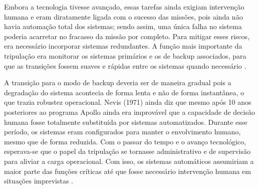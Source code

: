 Embora a tecnologia tivesse avançado, essas tarefas ainda exigiam intervenção humana e eram diratamente ligada com o sucesso das missões, pois ainda não havia automação total dos sistemas; sendo assim, uma única falha no sistema poderia acarretar no fracasso da missão por completo.
Para mitigar esses riscos, era necessário incorporar sistemas redundantes.
A função mais importante da tripulação era monitorar os sistemas primários e os de backup associados, para que as transições fossem suaves e rápidas entre os sistemas quando necessário \cite{nevins1971}.

A transição para o modo de backup deveria ser de maneira gradual pois a degradação do sistema acontecia de forma lenta e não de forma instantânea, o que trazia robustez operacional.
Nevis (1971) ainda diz que mesmo após 10 anos posteriores ao programa Apollo ainda era improvável que a capacidade de decisão humana fosse totalmente substituída por sistemas automatizados.
Durante esse período, os sistemas eram configurados para manter o envolvimento humano, mesmo que de forma reduzida.
Com o passar do tempo e o avanço tecnológico, esperava-se que o papel da tripulação se tornasse administrativo e de supervisão para aliviar a carga operacional.
Com isso, os sistemas automáticos assumiriam a maior parte das funções críticas até que fosse necessário intervenção humana em situações imprevistas \cite{nevins1971}.
